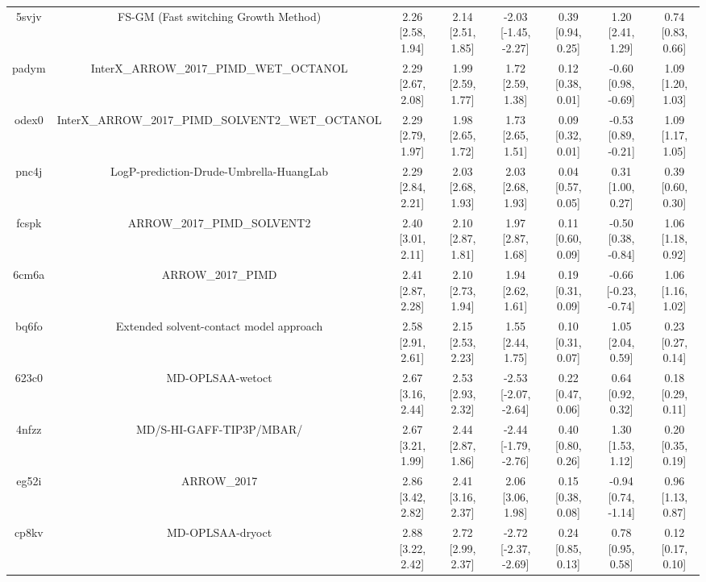 \documentclass{article}
\begin{document}
\begin{center}
\begin{longtable}{|cccccccc|}
 5svjv &               FS-GM (Fast switching Growth Method) &  2.26 [2.58, 1.94] &  2.14 [2.51, 1.85] &  -2.03 [-1.45, -2.27] &  0.39 [0.94, 0.25] &     1.20 [2.41, 1.29] &     0.74 [0.83, 0.66] \\
 padym &            InterX\_ARROW\_2017\_PIMD\_WET\_OCTANOL &  2.29 [2.67, 2.08] &  1.99 [2.59, 1.77] &     1.72 [2.59, 1.38] &  0.12 [0.38, 0.01] &   -0.60 [0.98, -0.69] &     1.09 [1.20, 1.03] \\
 odex0 &  InterX\_ARROW\_2017\_PIMD\_SOLVENT2\_WET\_OCTANOL &  2.29 [2.79, 1.97] &  1.98 [2.65, 1.72] &     1.73 [2.65, 1.51] &  0.09 [0.32, 0.01] &   -0.53 [0.89, -0.21] &     1.09 [1.17, 1.05] \\
 pnc4j &            LogP-prediction-Drude-Umbrella-HuangLab &  2.29 [2.84, 2.21] &  2.03 [2.68, 1.93] &     2.03 [2.68, 1.93] &  0.04 [0.57, 0.05] &     0.31 [1.00, 0.27] &     0.39 [0.60, 0.30] \\
 fcspk &                        ARROW\_2017\_PIMD\_SOLVENT2 &  2.40 [3.01, 2.11] &  2.10 [2.87, 1.81] &     1.97 [2.87, 1.68] &  0.11 [0.60, 0.09] &   -0.50 [0.38, -0.84] &     1.06 [1.18, 0.92] \\
 6cm6a &                                  ARROW\_2017\_PIMD &  2.41 [2.87, 2.28] &  2.10 [2.73, 1.94] &     1.94 [2.62, 1.61] &  0.19 [0.31, 0.09] &  -0.66 [-0.23, -0.74] &     1.06 [1.16, 1.02] \\
 bq6fo &            Extended solvent-contact model approach &  2.58 [2.91, 2.61] &  2.15 [2.53, 2.23] &     1.55 [2.44, 1.75] &  0.10 [0.31, 0.07] &     1.05 [2.04, 0.59] &     0.23 [0.27, 0.14] \\
 623c0 &                                   MD-OPLSAA-wetoct &  2.67 [3.16, 2.44] &  2.53 [2.93, 2.32] &  -2.53 [-2.07, -2.64] &  0.22 [0.47, 0.06] &     0.64 [0.92, 0.32] &     0.18 [0.29, 0.11] \\
 4nfzz &                           MD/S-HI-GAFF-TIP3P/MBAR/ &  2.67 [3.21, 1.99] &  2.44 [2.87, 1.86] &  -2.44 [-1.79, -2.76] &  0.40 [0.80, 0.26] &     1.30 [1.53, 1.12] &     0.20 [0.35, 0.19] \\
 eg52i &                                        ARROW\_2017 &  2.86 [3.42, 2.82] &  2.41 [3.16, 2.37] &     2.06 [3.06, 1.98] &  0.15 [0.38, 0.08] &   -0.94 [0.74, -1.14] &     0.96 [1.13, 0.87] \\
 cp8kv &                                   MD-OPLSAA-dryoct &  2.88 [3.22, 2.42] &  2.72 [2.99, 2.37] &  -2.72 [-2.37, -2.69] &  0.24 [0.85, 0.13] &     0.78 [0.95, 0.58] &     0.12 [0.17, 0.10] \\

\end{longtable}
\end{center}
\end{document}
